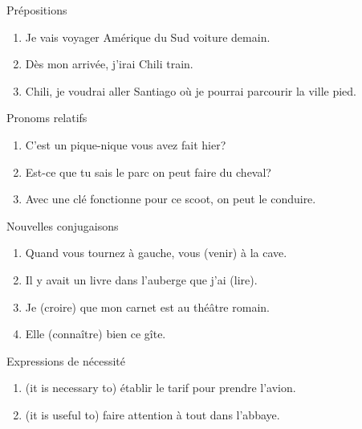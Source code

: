 \documentclass{beamer}
\begin{document}
  \begin{frame}{Prépositions}
    \begin{enumerate}
      \item Je vais voyager \underline{\uncover<2->{en}} Amérique du Sud \underline{} voiture demain.
      \item Dès mon arrivée, j'irai \underline{} Chili \underline{} train.
      \item \underline{} Chili, je voudrai aller \underline{} Santiago où je pourrai parcourir la ville \underline{} pied.
    \end{enumerate}
  \end{frame}

  \begin{frame}{Pronoms relatifs}
    \begin{enumerate}
      \item C'est un pique-nique \underline{} vous avez fait hier?
      \item Est-ce que tu sais le parc \underline{} on peut faire du cheval?
      \item Avec une clé \underline{} fonctionne pour ce scoot, on peut le conduire.
    \end{enumerate}
  \end{frame}

  \begin{frame}{Nouvelles conjugaisons}
    \begin{enumerate}
      \item Quand vous tournez à gauche, vous \underline{} (venir) à la cave.
      \item Il y avait un livre dans l'auberge que j'ai \underline{} (lire).
      \item Je \underline{} (croire) que mon carnet est au théâtre romain.
      \item Elle \underline{} (connaître) bien ce gîte.
    \end{enumerate}
  \end{frame}

  \begin{frame}{Expressions de nécessité}
    \begin{enumerate}
      \item \underline{} (it is necessary to) établir le tarif pour prendre l'avion.
      \item \underline{} (it is useful to) faire attention à tout dans l'abbaye.
    \end{enumerate}
  \end{frame}
\end{document}
